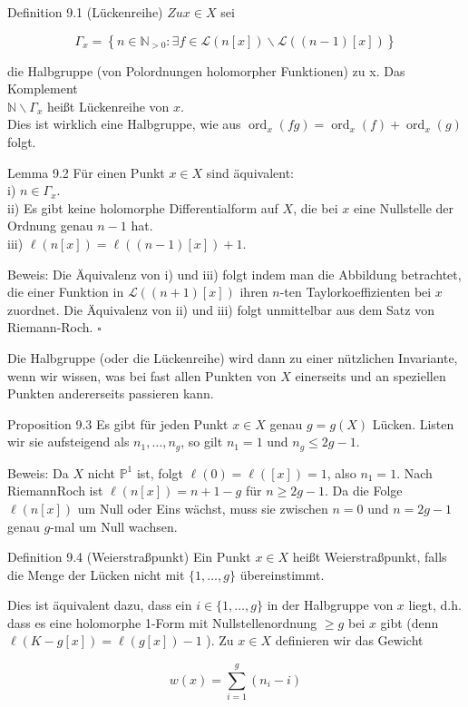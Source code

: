 \documentclass[10pt, letterpaper]{article}
\begin{document}
Definition 9.1 (Lückenreihe) $Z u x \in X$ sei

$$
\Gamma_{x}=\left\{n \in \mathbb{N}_{>0}: \exists f \in \mathcal{L}(n[x]) \backslash \mathcal{L}((n-1)[x])\right\}
$$

die Halbgruppe (von Polordnungen holomorpher Funktionen) zu x. Das Komplement\\
$\mathbb{N} \backslash \Gamma_{x}$ heißt Lückenreihe von $x$.\\
Dies ist wirklich eine Halbgruppe, wie aus $\operatorname{ord}_{x}(f g)=\operatorname{ord}_{x}(f)+\operatorname{ord}_{x}(g)$ folgt.

Lemma 9.2 Für einen Punkt $x \in X$ sind äquivalent:\\
i) $n \in \Gamma_{x}$.\\
ii) Es gibt keine holomorphe Differentialform auf $X$, die bei $x$ eine Nullstelle der Ordnung genau $n-1$ hat.\\
iii) $\ell(n[x])=\ell((n-1)[x])+1$.

Beweis: Die Äquivalenz von i) und iii) folgt indem man die Abbildung betrachtet, die einer Funktion in $\mathcal{L}((n+1)[x])$ ihren $n$-ten Taylorkoeffizienten bei $x$ zuordnet. Die Äquivalenz von ii) und iii) folgt unmittelbar aus dem Satz von Riemann-Roch. \(\square\)

Die Halbgruppe (oder die Lückenreihe) wird dann zu einer nützlichen Invariante, wenn wir wissen, was bei fast allen Punkten von $X$ einerseits und an speziellen Punkten andererseits passieren kann.

Proposition 9.3 Es gibt für jeden Punkt $x \in X$ genau $g=g(X)$ Lücken. Listen wir sie aufsteigend als $n_{1}, \ldots, n_{g}$, so gilt $n_{1}=1$ und $n_{g} \leqslant 2 g-1$.

Beweis: Da $X$ nicht $\mathbb{P}^{1}$ ist, folgt $\ell(0)=\ell([x])=1$, also $n_{1}=1$. Nach RiemannRoch ist $\ell(n[x])=n+1-g$ für $n \geqslant 2 g-1$. Da die Folge $\ell(n[x])$ um Null oder Eins wächst, muss sie zwischen $n=0$ und $n=2 g-1$ genau $g$-mal um Null wachsen.

Definition 9.4 (Weierstraßpunkt) Ein Punkt $x \in X$ heißt Weierstraßpunkt, falls die Menge der Lücken nicht mit $\{1, \ldots, g\}$ übereinstimmt.

Dies ist äquivalent dazu, dass ein $i \in\{1, \ldots, g\}$ in der Halbgruppe von $x$ liegt, d.h. dass es eine holomorphe 1-Form mit Nullstellenordnung $\geq g$ bei $x$ gibt (denn $\ell(K-g[x])=\ell(g[x])-1$ ). Zu $x \in X$ definieren wir das Gewicht

$$
w(x)=\sum_{i=1}^{g}\left(n_{i}-i\right)
$$
\end{document}

